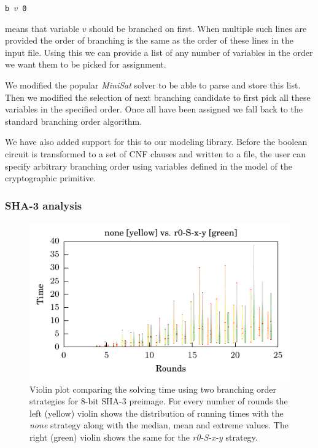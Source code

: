 \centerline{\texttt{b $v$ 0}}

\noindent means that variable $v$ should be branched on first.
When multiple such lines are provided the order of branching is the same as the order of these lines in the input file.
Using this we can provide a list of any number of variables in the order we want them to be picked for assignment.

We modified the popular \emph{MiniSat} solver to be able to parse and store this list.
Then we modified the selection of next branching candidate to first pick all these variables in the specified order.
Once all have been assigned we fall back to the standard branching order algorithm.

We have also added support for this to our modeling library.
Before the boolean circuit is transformed to a set of CNF clauses and written to a file, the user can specify arbitrary branching order using variables defined in the model of the cryptographic primitive.


\subsubsection{SHA-3 analysis}
\begin{figure}
\centering \includegraphics{figures/bo-ex1/sbs-time-none-r0sxy.pdf}
\caption{Violin plot comparing the solving time using two branching order strategies for $8$-bit SHA-3 preimage. For every number of rounds the left (yellow) violin shows the distribution of running times with the \emph{none} strategy along with the median, mean and extreme values. The right (green) violin shows the same for the \emph{r0-S-x-y} strategy.}
\label{fig:bo-sbs-time-none-r0sxy}
\end{figure}

